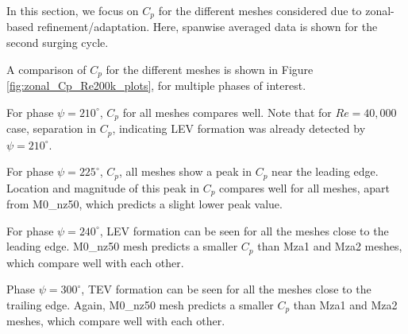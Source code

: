 
In this section, we focus on $C_p$ for the different meshes considered due to zonal-based refinement/adaptation.
Here, spanwise averaged data is shown for the second surging cycle.

A comparison of $C_p$ for the different meshes is shown in Figure \ref{fig:zonal_Cp_Re200k_plots}, for multiple phases of interest. 


For phase $\psi=210^\circ$, $C_p$ for all meshes compares well. Note that for $Re=40,000$ case, separation in $C_p$, indicating LEV formation was already detected by $\psi=210^\circ$. 

For phase $\psi=225^\circ$, $C_p$, all meshes show a peak in $C_p$ near the leading edge.
Location and magnitude of this peak in $C_p$ compares well for all meshes, apart from M0\_nz50, which predicts a slight lower peak value. 

For phase $\psi=240^\circ$, LEV formation can be seen for all the meshes close to the leading edge.
M0\_nz50 mesh predicts a smaller $C_p$ than Mza1 and Mza2 meshes, which compare well with each other.

Phase $\psi=300^\circ$, TEV formation can be seen for all the meshes close to the trailing edge.
Again, M0\_nz50 mesh predicts a smaller $C_p$ than Mza1 and Mza2 meshes, which compare well with each other.


